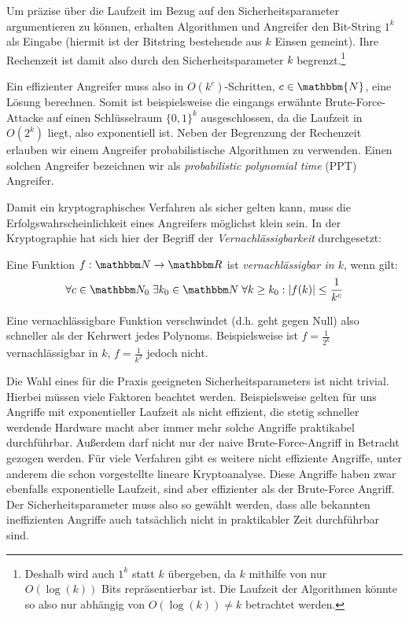 Um präzise über die Laufzeit im Bezug auf den Sicherheitsparameter argumentieren zu können, erhalten Algorithmen und Angreifer den Bit-String $1^k$ als Eingabe (hiermit ist der Bitstring bestehende aus $k$ Einsen gemeint). Ihre Rechenzeit ist damit also durch den Sicherheitsparameter $k$ begrenzt.\footnote{Deshalb wird auch $1^k$ statt $k$ übergeben, da $k$ mithilfe von nur $O(\log(k))$ Bits repräsentierbar ist. Die Laufzeit der Algorithmen könnte so also nur abhängig von $O(\log(k)) \neq k$ betrachtet werden.} 

Ein effizienter Angreifer muss also in $O(k^c)$-Schritten, $c \in \mathbbm{N}$, eine Lösung berechnen. Somit ist beispielsweise die eingangs erwähnte Brute-Force-Attacke auf einen Schlüsselraum $\{0, 1\}^{k}$ ausgeschlossen, da die Laufzeit in $O(2^{k})$ liegt, also exponentiell ist.
Neben der Begrenzung der Rechenzeit erlauben wir einem Angreifer probabilistische Algorithmen zu verwenden. Einen solchen Angreifer bezeichnen wir als \emph{probabilistic polynomial time} (PPT) Angreifer.

Damit ein kryptographisches Verfahren als sicher gelten kann, muss die Erfolgswahrscheinlichkeit eines Angreifers möglichst \glqq klein\grqq{} sein. In der Kryptographie hat sich hier der Begriff der \emph{Vernachlässigbarkeit} durchgesetzt:
\begin{definition}[Vernachlässigbarkeit]
	Eine Funktion $f: \N \to \R$ ist \emph{vernachlässigbar in $k$}, wenn gilt:
	\begin{align*}
	\forall c \in \N_0 \; \exists k_0 \in \N \; \forall k \geq k_0 : \vert f(k) \vert \leq \frac{1}{k^c} 
	\end{align*}
\end{definition}
Eine vernachlässigbare Funktion \glqq verschwindet\grqq{} (d.h. geht gegen Null) also schneller als der Kehrwert jedes Polynoms. Beispielsweise ist $f = \frac{1}{2^k}$ vernachlässigbar in $k$, $f = \frac{1}{k^2}$ jedoch nicht.

Die Wahl eines für die Praxis geeigneten Sicherheitsparameters ist nicht trivial. Hierbei müssen viele Faktoren beachtet werden. Beispielsweise gelten für uns Angriffe mit exponentieller Laufzeit als nicht effizient, die stetig schneller werdende Hardware macht aber immer mehr solche Angriffe praktikabel durchführbar.
Außerdem darf nicht nur der naive Brute-Force-Angriff in Betracht gezogen werden. Für viele Verfahren gibt es weitere nicht effiziente Angriffe, unter anderem die schon vorgestellte lineare Kryptoanalyse. Diese Angriffe haben zwar ebenfalls exponentielle Laufzeit, sind aber effizienter als der Brute-Force Angriff. Der Sicherheitsparameter muss also so gewählt werden, dass alle bekannten ineffizienten Angriffe auch tatsächlich nicht in praktikabler Zeit durchführbar sind. 

